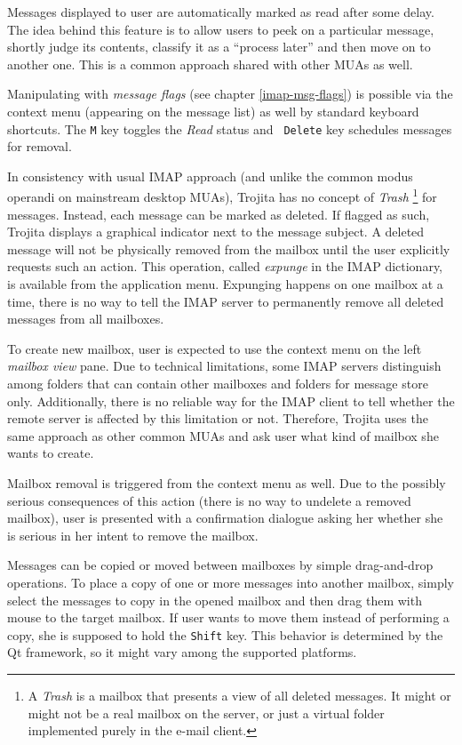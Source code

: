 \documentclass[12pt,notitlepage]{report}
\newcommand{\trojita}{Trojita\xspace}
\begin{document}
Messages displayed to user are automatically marked as read after some delay.
The idea behind this feature is to allow users to peek on a particular message,
shortly judge its contents, classify it as a ``process later'' and then move on
to another one.  This is a common approach shared with other MUAs as well.

Manipulating with {\em message flags} (see chapter \ref{imap-msg-flags}) is possible
via the context menu (appearing on the message list) as well by standard
keyboard shortcuts.  The {\tt M} key toggles the {\em Read} status and {\tt
Delete} key schedules messages for removal.

In consistency with usual IMAP approach (and unlike the common modus operandi on
mainstream desktop MUAs), \trojita has no concept of {\em Trash}
\footnote{A {\em Trash} is a mailbox that presents a view of all deleted
messages.  It might or might not be a real mailbox on the server, or just a
virtual folder implemented purely in the e-mail client.} for
messages.  Instead, each message can be marked as deleted.  If flagged as such,
\trojita displays a graphical indicator next to the message subject.  A deleted
message will not be physically removed from the mailbox until the user explicitly
requests such an action.  This operation, called {\em expunge} in the IMAP
dictionary, is available from the application menu.  Expunging happens on one
mailbox at a time, there is no way to tell the IMAP server to permanently remove
all deleted messages from all mailboxes.

To create new mailbox, user is expected to use the context menu on the left {\em
mailbox view} pane.  Due to technical limitations, some IMAP servers distinguish
among folders that can contain other mailboxes and folders for message store
only.  Additionally, there is no reliable way for the IMAP client to tell
whether the remote server is affected by this limitation or not.  Therefore,
\trojita uses the same approach as other common MUAs and ask user what kind of
mailbox she wants to create.


Mailbox removal is triggered from the context menu as well.  Due to the possibly
serious consequences of this action (there is no way to undelete a removed
mailbox), user is presented with a confirmation dialogue asking her whether she
is serious in her intent to remove the mailbox.

Messages can be copied or moved between mailboxes by simple drag-and-drop
operations.  To place a copy of one or more messages into another mailbox,
simply select the messages to copy in the opened mailbox and then drag them with
mouse to the target mailbox.  If user wants to move them instead of performing a
copy, she is supposed to hold the {\tt Shift} key.  This behavior is determined
by the Qt framework, so it might vary among the supported platforms.
\end{document}
